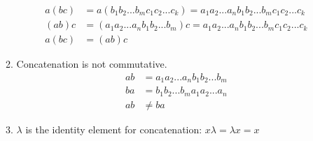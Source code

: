\begin{enumerate}[label={\Alph*.},font={\bfseries}]
\begin{enumerate}[label={\arabic*},font={\bfseries}]
        \begin{align*}
          a(bc) &= a(b_1b_2...b_mc_1c_2...c_k) = a_1a_2...a_nb_1b_2...b_mc_1c_2...c_k \\
          (ab)c &= (a_1a_2...a_nb_1b_2...b_m)c = a_1a_2...a_nb_1b_2...b_mc_1c_2...c_k \\
          a(bc) &= (ab)c
        \end{align*}
      \item Concatenation is not commutative.
        \begin{align*}
          ab &= a_1a_2...a_nb_1b_2...b_m \\
          ba &= b_1b_2...b_ma_1a_2...a_n \\
          ab &\neq ba
        \end{align*}
      \item $\lambda$ is the identity element for concatenation:
        $x\lambda = \lambda{}x = x$
    \end{enumerate}
\end{enumerate}
